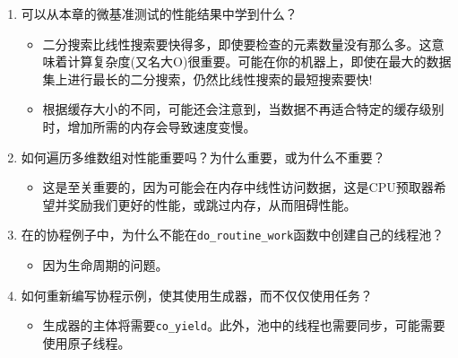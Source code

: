 \begin{enumerate}
\item
可以从本章的微基准测试的性能结果中学到什么？
\begin{itemize}
\item 
二分搜索比线性搜索要快得多，即使要检查的元素数量没有那么多。这意味着计算复杂度(又名大O)很重要。可能在你的机器上，即使在最大的数据集上进行最长的二分搜索，仍然比线性搜索的最短搜索要快!

\item 
根据缓存大小的不同，可能还会注意到，当数据不再适合特定的缓存级别时，增加所需的内存会导致速度变慢。
\end{itemize}

\item
如何遍历多维数组对性能重要吗？为什么重要，或为什么不重要？
\begin{itemize}
\item 
这是至关重要的，因为可能会在内存中线性访问数据，这是CPU预取器希望并奖励我们更好的性能，或跳过内存，从而阻碍性能。
\end{itemize}

\item
在的协程例子中，为什么不能在\texttt{do\_routine\_work}函数中创建自己的线程池？
\begin{itemize}
\item 
因为生命周期的问题。
\end{itemize}

\item
如何重新编写协程示例，使其使用生成器，而不仅仅使用任务？
\begin{itemize}
\item 
生成器的主体将需要\texttt{co\_yield}。此外，池中的线程也需要同步，可能需要使用原子线程。
\end{itemize}
\end{enumerate}